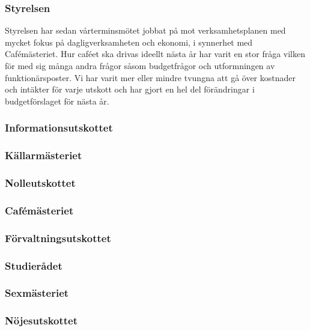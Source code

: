 \documentclass[../_main/handlingar.tex]{subfiles}
\begin{document}

\subsubsection*{Styrelsen}
Styrelsen har sedan vårterminsmötet jobbat på mot verksamhetsplanen med mycket fokus på dagligverksamheten och ekonomi, i synnerhet med Cafémästeriet. Hur caféet ska drivas ideellt nästa år har varit en stor fråga vilken för med sig många andra frågor såsom budgetfrågor och utformningen av funktionärsposter. Vi har varit mer eller mindre tvungna att gå över kostnader och intäkter för varje utskott och har gjort en hel del förändringar i budgetförslaget för nästa år.

\subsubsection*{Informationsutskottet}

\subsubsection*{Källarmästeriet}

\subsubsection*{Nolleutskottet}

\subsubsection*{Cafémästeriet}

\subsubsection*{Förvaltningsutskottet}

\subsubsection*{Studierådet}

\subsubsection*{Sexmästeriet}

\subsubsection*{Nöjesutskottet}
\end{document}
